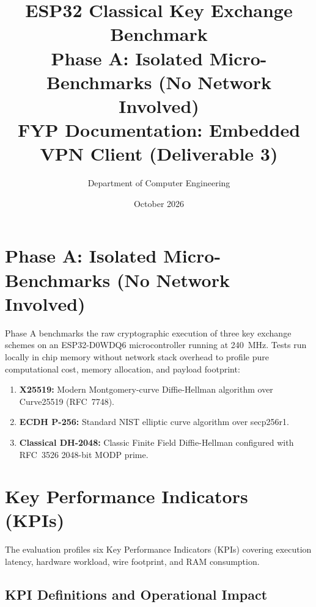 \documentclass[11pt,a4paper]{article}
\title{\textbf{ESP32 Classical Key Exchange Benchmark}\\[0.2em]\large Phase A: Isolated Micro-Benchmarks (No Network Involved)\\[0.2em]\normalsize FYP Documentation: Embedded VPN Client (Deliverable 3)}
\author{Department of Computer Engineering}
\date{October 2026}
\begin{document}
\maketitle

\section{Phase A: Isolated Micro-Benchmarks (No Network Involved)}

Phase A benchmarks the raw cryptographic execution of three key exchange schemes on an ESP32-D0WDQ6 microcontroller running at 240~MHz. Tests run locally in chip memory without network stack overhead to profile pure computational cost, memory allocation, and payload footprint:
\begin{enumerate}
    \item \textbf{X25519:} Modern Montgomery-curve Diffie-Hellman algorithm over Curve25519 (RFC~7748).
    \item \textbf{ECDH P-256:} Standard NIST elliptic curve algorithm over secp256r1.
    \item \textbf{Classical DH-2048:} Classic Finite Field Diffie-Hellman configured with RFC~3526 2048-bit MODP prime.
\end{enumerate}

\section{Key Performance Indicators (KPIs)}

The evaluation profiles six Key Performance Indicators (KPIs) covering execution latency, hardware workload, wire footprint, and RAM consumption.

\subsection{KPI Definitions and Operational Impact}
\end{document}

